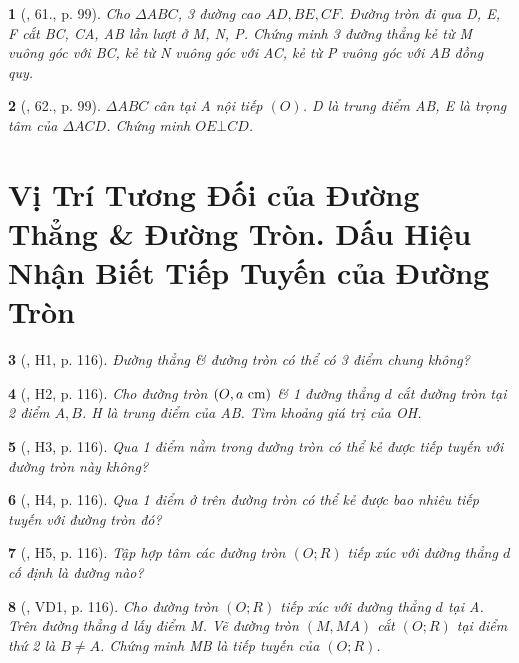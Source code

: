 \documentclass{article}
\newtheorem{baitoan}{}
\begin{document}
\begin{baitoan}[\cite{Binh_Toan_9_tap_1}, 61., p. 99]
	Cho $\Delta ABC$, 3 đường cao $AD,BE,CF$. Đường tròn đi qua D, E, F cắt BC, CA, AB lần lượt ở M, N, P. Chứng minh 3 đường thẳng kẻ từ M vuông góc với BC, kẻ từ N vuông góc với AC, kẻ từ P vuông góc với AB đồng quy.
\end{baitoan}

\begin{baitoan}[\cite{Binh_Toan_9_tap_1}, 62., p. 99]
	$\Delta ABC$ cân tại A nội tiếp $(O)$. D là trung điểm AB, E là trọng tâm của $\Delta ACD$. Chứng minh $OE\bot CD$.
\end{baitoan}


\section{Vị Trí Tương Đối của Đường Thẳng \& Đường Tròn. Dấu Hiệu Nhận Biết Tiếp Tuyến của Đường Tròn}

\begin{baitoan}[\cite{Binh_boi_duong_Toan_9_tap_1}, H1, p. 116]
	Đường thẳng \& đường tròn có thể có 3 điểm chung không?
\end{baitoan}

\begin{baitoan}[\cite{Binh_boi_duong_Toan_9_tap_1}, H2, p. 116]
	Cho đường tròn $(O,a\ {\rm cm})$ \& 1 đường thẳng $d$ cắt đường tròn tại 2 điểm $A,B$. H là trung điểm của AB. Tìm khoảng giá trị của OH.
\end{baitoan}

\begin{baitoan}[\cite{Binh_boi_duong_Toan_9_tap_1}, H3, p. 116]
	Qua 1 điểm nằm trong đường tròn có thể kẻ được tiếp tuyến với đường tròn này không?
\end{baitoan}

\begin{baitoan}[\cite{Binh_boi_duong_Toan_9_tap_1}, H4, p. 116]
	Qua 1 điểm ở trên đường tròn có thể kẻ được bao nhiêu tiếp tuyến với đường tròn đó?
\end{baitoan}

\begin{baitoan}[\cite{Binh_boi_duong_Toan_9_tap_1}, H5, p. 116]
	Tập hợp tâm các đường tròn $(O;R)$ tiếp xúc với đường thẳng $d$ cố định là đường nào?
\end{baitoan}

\begin{baitoan}[\cite{Binh_boi_duong_Toan_9_tap_1}, VD1, p. 116]
	Cho đường tròn $(O;R)$ tiếp xúc với đường thẳng $d$ tại A. Trên đường thẳng $d$ lấy điểm M. Vẽ đường tròn $(M,MA)$ cắt $(O;R)$ tại điểm thứ 2 là $B\ne A$. Chứng minh MB là tiếp tuyến của $(O;R)$.
\end{baitoan}
\end{document}
